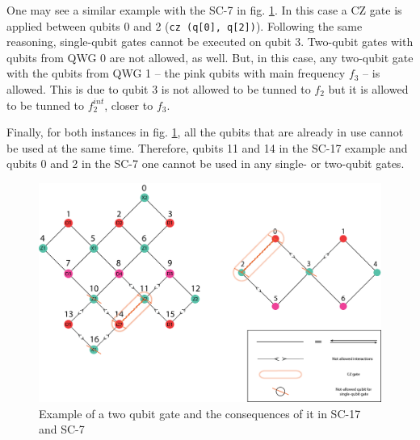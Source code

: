 \documentclass[11pt]{article}
\begin{document}
One may see a similar example with the SC-7 in fig. \ref{fig:two_qubit_gate_ex}. In this case a CZ gate is applied between qubits 0 and 2 (\texttt{cz (q[0], q[2])}). Following the same reasoning, single-qubit gates cannot be executed on qubit 3. Two-qubit gates with qubits from QWG 0 are not allowed, as well. But, in this case, any two-qubit gate with the qubits from QWG 1 -- the pink qubits with main frequency $f_3$ -- is allowed. This is due to qubit 3 is not allowed to be tunned to $f_2$ but it is allowed to be tunned to $f_2^{int}$, closer to $f_3$.

Finally, for both instances in fig. \ref{fig:two_qubit_gate_ex}, all the qubits that are already in use cannot be used at the same time. Therefore, qubits 11 and 14 in the SC-17 example and qubits 0 and 2 in the SC-7 one cannot be used in any single- or two-qubit gates.



\begin{figure}[h!]
\centering
\includegraphics[width=\textwidth]{two_qubit_constraint_sc17.png}
\caption{\label{fig:two_qubit_gate_ex}
Example of a two qubit gate and the consequences of it in SC-17 and SC-7}
\end{figure}


\end{document}
